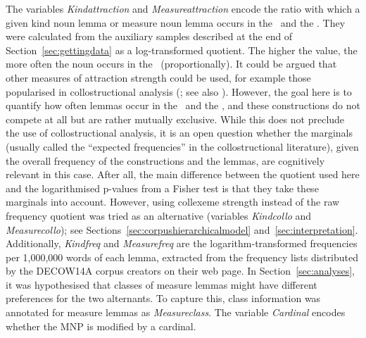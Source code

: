 The variables \textit{Kindattraction} and \textit{Measureattraction} encode the ratio with which a given kind noun lemma or measure noun lemma occurs in the \PGCd\ and the \NACb.
They were calculated from the auxiliary samples described at the end of Section~\ref{sec:gettingdata} as a log-transformed quotient.
The higher the value, the more often the noun occurs in the \PGCd\ (proportionally).
It could be argued that other measures of attraction strength could be used, for example those popularised in collostructional analysis (\citealp{StefanowitschGries2003,GriesStefanowitsch2004}; see also \citealp{Gries2015a}).
However, the goal here is to quantify how often lemmas occur in the \PGCd\ and the \NACb, and these constructions do not compete at all but are rather mutually exclusive.
While this does not preclude the use of collostructional analysis, it is an open question whether the marginals (usually called the ``expected frequencies'' in the collostructional literature), given the overall frequency of the constructions and the lemmas, are cognitively relevant in this case.
After all, the main difference between the quotient used here and the logarithmised p-values from a Fisher test is that they take these marginals into account. 
However, using collexeme strength instead of the raw frequency quotient was tried as an alternative (variables \textit{Kindcollo} and \textit{Measurecollo}); see Sections~\ref{sec:corpushierarchicalmodel} and~\ref{sec:interpretation}.
Additionally, \textit{Kindfreq} and \textit{Measurefreq} are the logarithm-transformed frequencies per 1,000,000 words of each lemma, extracted from the frequency lists distributed by the DECOW14A corpus creators on their web page.
In Section~\ref{sec:analyses}, it was hypothesised that classes of measure lemmas might have different preferences for the two alternants.
To capture this, class information was annotated for measure lemmas as \textit{Measureclass}.
The variable \textit{Cardinal} encodes whether the MNP is modified by a cardinal.

